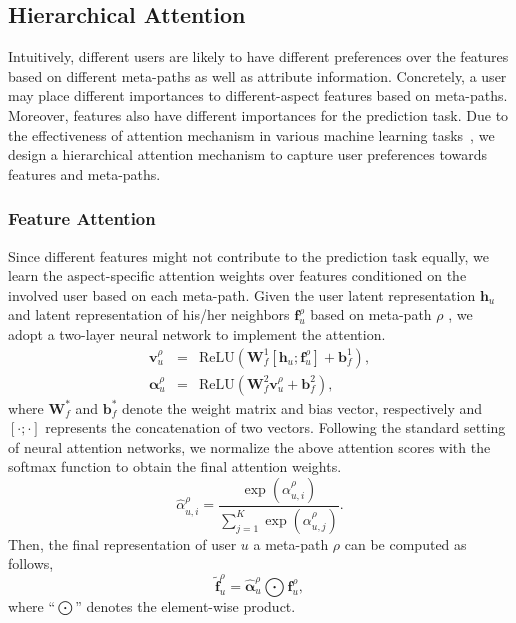 \subsection{Hierarchical Attention}
Intuitively, different users are likely to have different preferences over the features based on different meta-paths as well as attribute information. Concretely, a user may place different importances to different-aspect features based on meta-paths. Moreover, features also have different importances for the prediction task.
Due to the effectiveness of attention mechanism in various machine learning tasks~\citep{hu2018leveraging,Cheng2018A,you2016image}, we design a hierarchical attention mechanism to capture user preferences towards features and meta-paths.
\subsubsection{Feature Attention}
Since different features might not contribute to the prediction task equally, we learn the aspect-specific attention weights over features conditioned on the involved user based on each meta-path. Given the user latent representation $\mathbf{h}_u$ and latent representation of his/her neighbors $\mathbf{f}^{\rho}_u$ based on meta-path $\rho$ , we adopt a two-layer neural network to implement the attention.
\begin{eqnarray}
\bm{v}_u^{\rho} &=& \text{ReLU}(\mathbf{W}_f^1[\mathbf{h}_u ; \mathbf{f}_u^{\rho}] +\mathbf{b}_f^1), \\
\bm{\alpha}_u^{\rho} &=& \text{ReLU}(\mathbf{W}_f^2\bm{v}_u^{\rho} + \mathbf{b}_f^2),
\end{eqnarray}
where $\mathbf{W}_f^*$ and $\mathbf{b}_f^*$ denote the weight matrix and bias vector, respectively and $[\cdot ; \cdot]$ represents the concatenation of two vectors. Following the standard setting of neural attention networks, we normalize the above attention scores with the softmax function to obtain the final attention weights.
\begin{equation}
\hat{\alpha}_{u, i}^{\rho} = \frac{\exp(\alpha_{u, i}^{\rho})}{\sum_{j = 1}^{K}{\exp(\alpha_{u, j}^{\rho})}}.
\end{equation}
Then, the final representation of user $u$ \wrt a meta-path $\rho$ can be computed as follows,
\begin{equation}
\label{equ-f-tilde}
\widetilde{\mathbf{f}}^{\rho}_u = \bm{\hat{\alpha}}_u^{\rho} \bigodot \mathbf{f}_u^{\rho},
\end{equation}
where ``$\bigodot$'' denotes the element-wise product.

